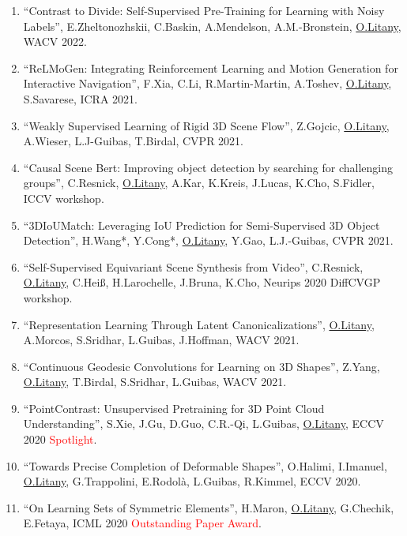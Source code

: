 \begin{enumerate}
\item ``Contrast to Divide: Self-Supervised Pre-Training for Learning with Noisy Labels'', E.Zheltonozhskii, C.Baskin, A.Mendelson, A.M.-Bronstein, \underline{O.Litany}, WACV 2022.

\item ``ReLMoGen: Integrating Reinforcement Learning and Motion Generation for Interactive Navigation'', F.Xia, C.Li, R.Martin-Martin, A.Toshev, \underline{O.Litany}, S.Savarese, ICRA 2021.

\item ``Weakly Supervised Learning of Rigid 3D Scene Flow'', Z.Gojcic, \underline{O.Litany}, A.Wieser, L.J-Guibas, T.Birdal, CVPR 2021.

\item ``Causal Scene Bert: Improving object detection by searching for challenging groups'', C.Resnick, \underline{O.Litany}, A.Kar, K.Kreis, J.Lucas, K.Cho, S.Fidler, ICCV workshop.

\item ``3DIoUMatch: Leveraging IoU Prediction for Semi-Supervised 3D Object Detection'', H.Wang*, Y.Cong*, \underline{O.Litany}, Y.Gao, L.J.-Guibas, CVPR 2021.

\item ``Self-Supervised Equivariant Scene Synthesis from Video'', C.Resnick, \underline{O.Litany}, C.Heiß, H.Larochelle, J.Bruna, K.Cho, Neurips 2020 DiffCVGP workshop.

\item ``Representation Learning Through Latent Canonicalizations'', \underline{O.Litany}, A.Morcos, S.Sridhar, L.Guibas, J.Hoffman, WACV 2021.

\item ``Continuous Geodesic Convolutions for Learning on 3D Shapes'', Z.Yang, \underline{O.Litany}, T.Birdal, S.Sridhar, L.Guibas, WACV 2021.

\item ``PointContrast: Unsupervised Pretraining for 3D Point Cloud Understanding'', S.Xie, J.Gu, D.Guo, C.R.-Qi, L.Guibas, \underline{O.Litany}, ECCV 2020 \textcolor{red}{Spotlight}.

\item ``Towards Precise Completion of Deformable Shapes'', O.Halimi, I.Imanuel, \underline{O.Litany}, G.Trappolini, E.Rodolà, L.Guibas, R.Kimmel, ECCV 2020.

\item ``On Learning Sets of Symmetric Elements'', H.Maron, \underline{O.Litany}, G.Chechik, E.Fetaya, ICML 2020 \textcolor{red}{Outstanding Paper Award}.


\end{enumerate}
